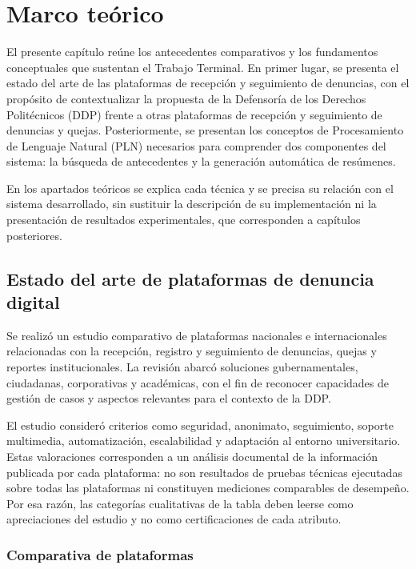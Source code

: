 \chapter{Marco teórico}

El presente capítulo reúne los antecedentes comparativos y los fundamentos conceptuales que sustentan el Trabajo Terminal. En primer lugar, se presenta el estado del arte de las plataformas de recepción y seguimiento de denuncias, con el propósito de contextualizar la propuesta de la Defensoría de los Derechos Politécnicos (DDP) frente a otras plataformas de recepción y seguimiento de denuncias y quejas. Posteriormente, se presentan los conceptos de Procesamiento de Lenguaje Natural (PLN) necesarios para comprender dos componentes del sistema: la búsqueda de antecedentes y la generación automática de resúmenes.

En los apartados teóricos se explica cada técnica y se precisa su relación con el sistema desarrollado, sin sustituir la descripción de su implementación ni la presentación de resultados experimentales, que corresponden a capítulos posteriores.

\section{Estado del arte de plataformas de denuncia digital}
\label{sec:estado_arte_plataformas}

Se realizó un estudio comparativo de plataformas nacionales e internacionales relacionadas con la recepción, registro y seguimiento de denuncias, quejas y reportes institucionales. La revisión abarcó soluciones gubernamentales, ciudadanas, corporativas y académicas, con el fin de reconocer capacidades de gestión de casos y aspectos relevantes para el contexto de la DDP.

El estudio consideró criterios como seguridad, anonimato, seguimiento, soporte multimedia, automatización, escalabilidad y adaptación al entorno universitario. Estas valoraciones corresponden a un análisis documental de la información publicada por cada plataforma: no son resultados de pruebas técnicas ejecutadas sobre todas las plataformas ni constituyen mediciones comparables de desempeño. Por esa razón, las categorías cualitativas de la tabla deben leerse como apreciaciones del estudio y no como certificaciones de cada atributo.

\subsection{Comparativa de plataformas}

